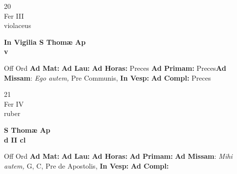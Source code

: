 \documentclass[10pt, openany]{book}
\begin{document}
        \begin{center}
            \begin{minipage}{3.5in}
                \vspace{2em}
                \begin{minipage}{0.5in}
                    {\Huge 20} \\
                    {\normalsize Fer III} \\
                    {\normalsize violaceus}
                \end{minipage}
                \begin{minipage}{3.0in}
                    \textbf{ \large In Vigilia S Thomæ Ap \\
                    \textnormal{\normalsize v}} \\ 
                \end{minipage}
                \begin{justify}Off Ord
                    \textbf{Ad Mat: }
                    \textbf{Ad Lau: }
                    \textbf{Ad Horas: }Preces
                    \textbf{Ad Primam: }Preces\textbf{Ad Missam}: \textit{Ego autem,} Pre Communis,  
                    \textbf{In Vesp: }
                    \textbf{Ad Compl: }Preces
                \end{justify}
            \end{minipage}
        \end{center}
    
        \begin{center}
            \begin{minipage}{3.5in}
                \vspace{2em}
                \begin{minipage}{0.5in}
                    {\Huge 21} \\
                    {\normalsize Fer IV} \\
                    {\normalsize ruber}
                \end{minipage}
                \begin{minipage}{3.0in}
                    \textbf{ \large S Thomæ Ap \\
                    \textnormal{\normalsize d II cl}} \\ 
                \end{minipage}
                \begin{justify}Off Ord
                    \textbf{Ad Mat: }
                    \textbf{Ad Lau: }
                    \textbf{Ad Horas: }
                    \textbf{Ad Primam: }\textbf{Ad Missam}: \textit{Mihi autem,} G, C, Pre de Apostolis,  
                    \textbf{In Vesp: }
                    \textbf{Ad Compl: }
                \end{justify}
            \end{minipage}
        \end{center}
    
\end{document}
